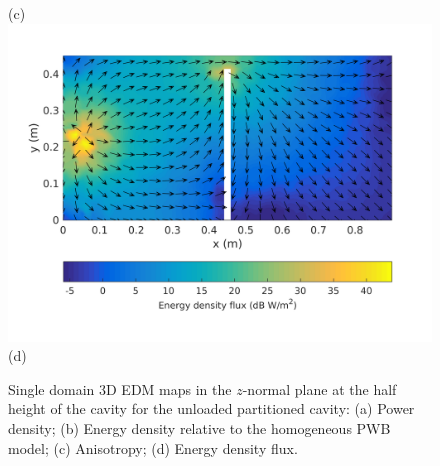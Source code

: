 \documentclass[a4paper]{article}
\numberwithin{equation}{section}
\begin{document}
\begin{figure}[ht]
\begin{center}
{\footnotesize (c)}\\
\vspace{2mm}
\includegraphics[trim={0 11mm 0 12mm},clip,width=0.55\linewidth]{figures/SDM_3D_DU_EnergyDensityFluxMap}\\
{\footnotesize (d)}\\
\vspace{-2mm}
\caption{\label{fg:partemptysdm_maps} Single domain 3D EDM maps in the $z$-normal plane at the half height of the cavity for the 
unloaded partitioned cavity: (a) Power density; (b) Energy density relative to the homogeneous PWB model;
(c) Anisotropy; (d) Energy density flux.}
\end{center}
\end{figure}
\end{document}
